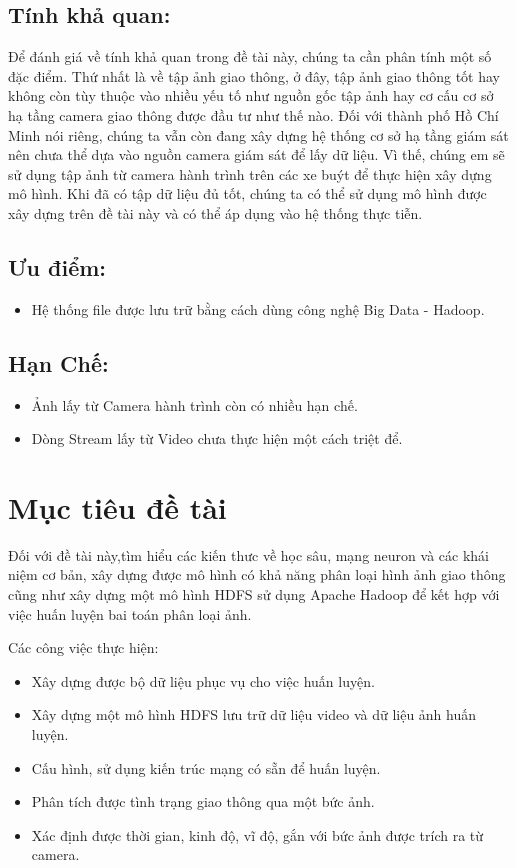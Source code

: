 \subsection{Tính khả quan:}
Để đánh giá về tính khả quan trong đề tài này, chúng ta cần phân tính một số đặc điểm. Thứ nhất là về tập ảnh giao thông, ở đây, tập ảnh giao thông tốt hay không còn tùy thuộc vào nhiều yếu tố như nguồn gốc tập ảnh hay cơ cấu cơ sở hạ tầng camera giao thông được đầu tư như thế nào. Đối với thành phố Hồ Chí Minh nói riêng, chúng ta vẫn còn đang xây dựng hệ thống cơ sở hạ tầng giám sát nên chưa thể dựa vào nguồn camera giám sát để lấy dữ liệu. Vì thế, chúng em sẽ sử dụng tập ảnh từ camera hành trình trên các xe buýt để thực hiện xây dựng mô hình. Khi đã có tập dữ liệu đủ tốt, chúng ta có thể sử dụng mô hình được xây dựng trên đề tài này và có thể áp dụng vào hệ thống thực tiễn.
\subsection{Ưu điểm:}
\begin{itemize}
\item Hệ thống file được lưu trữ bằng cách dùng công nghệ Big Data - Hadoop.
\end{itemize}
\subsection{Hạn Chế:}
\begin{itemize}
\item Ảnh lấy từ Camera hành trình còn có nhiều hạn chế.
\item Dòng Stream lấy từ Video chưa thực hiện một cách triệt để.
\end{itemize}
\section{Mục tiêu đề tài}
Đối với đề tài này,tìm hiểu các kiến thưc về học sâu, mạng neuron và các khái niệm cơ bản, xây dựng được mô hình có khả năng phân loại hình ảnh giao thông cũng như xây dựng một mô hình HDFS sử dụng Apache Hadoop để kết hợp với việc huấn luyện bai toán phân loại ảnh.\par
Các công việc thực hiện:
\begin{itemize}
	\item Xây dựng được bộ dữ liệu phục vụ cho việc huấn luyện.
	\item Xây dựng một mô hình HDFS lưu trữ dữ liệu video và dữ liệu ảnh huấn luyện.
	\item Cấu hình, sử dụng kiến trúc mạng có sẵn để huấn luyện.
	\item Phân tích được tình trạng giao thông qua một bức ảnh.
	\item Xác định được thời gian, kinh độ, vĩ độ, gắn với bức ảnh được trích ra từ camera.	
\end{itemize}